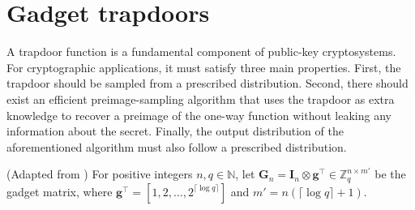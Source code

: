 \noindent\section{Gadget trapdoors}

A trapdoor function is a fundamental component of public-key cryptosystems. For cryptographic applications, it must satisfy three main properties. First, the trapdoor should be sampled from a prescribed distribution. Second, there should exist an efficient preimage-sampling algorithm that uses the trapdoor as extra knowledge to recover a preimage of the one-way function without leaking any information about the secret. Finally, the output distribution of the aforementioned algorithm must also follow a prescribed distribution. 

\begin{definition} (Adapted from \cite{C:MicPei12}) For positive integers $n,q \in \mathbb{N}$, let 
$\mathbf{G}_n = \mathbf{I}_n \otimes \mathbf{g}^{\top} \in \mathbb{Z}_q^{n \times m'}$ 
be the gadget matrix, where 
$\mathbf{g}^{\top} = [1,2,\ldots,2^{\lceil \log q \rceil}]$ 
and $m' = n(\lceil \log q \rceil + 1)$.
\end{definition}


